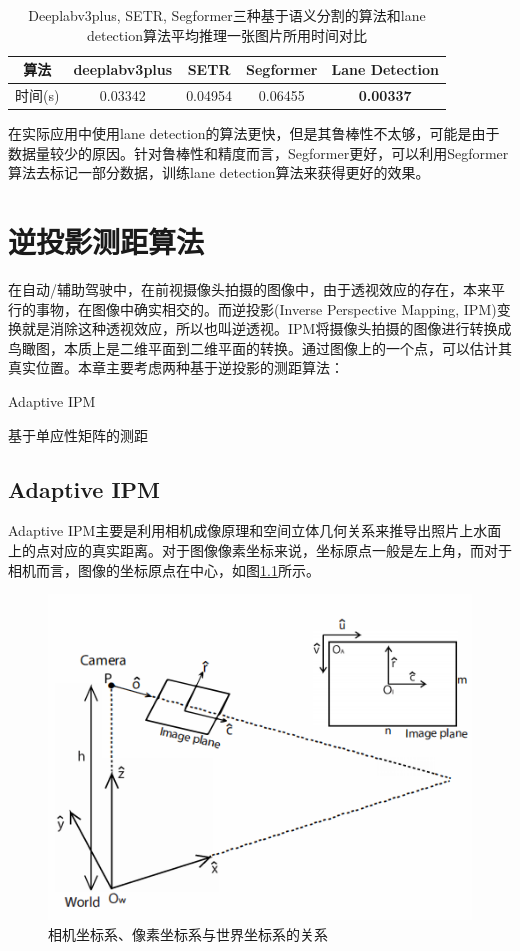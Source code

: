 \documentclass[cn,12pt,color=mine,scheme=chinese,bibstyle=gb7714-2015]{elegantbook}
\begin{document}
\begin{table}[h]
	\centering
	\caption{Deeplabv3plus, SETR, Segformer三种基于语义分割的算法和lane detection算法平均推理一张图片所用时间对比}
	\label{res2}
	\begin{tabular}{ccccc}
		\toprule
		算法 & deeplabv3plus & SETR & Segformer & Lane Detection \\
		\midrule
		时间(s) & 0.03342 & 0.04954 & 0.06455 & \textbf{0.00337} \\
		\bottomrule
	\end{tabular}
\end{table}

\begin{note}[总结]
	在实际应用中使用lane detection的算法更快，但是其鲁棒性不太够，可能是由于数据量较少的原因。针对鲁棒性和精度而言，Segformer更好，可以利用Segformer算法去标记一部分数据，训练lane detection算法来获得更好的效果。
\end{note}

\chapter{逆投影测距算法}
在自动/辅助驾驶中，在前视摄像头拍摄的图像中，由于透视效应的存在，本来平行的事物，在图像中确实相交的。而逆投影(Inverse Perspective Mapping, IPM)变换就是消除这种透视效应，所以也叫逆透视。IPM将摄像头拍摄的图像进行转换成鸟瞰图，本质上是二维平面到二维平面的转换。通过图像上的一个点，可以估计其真实位置。本章主要考虑两种基于逆投影的测距算法：
\begin{introduction}
	\item Adaptive IPM
	\item 基于单应性矩阵的测距
\end{introduction}

\section{Adaptive IPM}
Adaptive IPM\cite{jeong2016adaptive}主要是利用相机成像原理和空间立体几何关系来推导出照片上水面上的点对应的真实距离。对于图像像素坐标来说，坐标原点一般是左上角，而对于相机而言，图像的坐标原点在中心，如图\ref{ordi}所示。

\begin{figure}[h]
	\centering
	\includegraphics[width=.65\linewidth]{images/camera}
	\caption{相机坐标系、像素坐标系与世界坐标系的关系}
	\label{ordi}
\end{figure}
\end{document}
